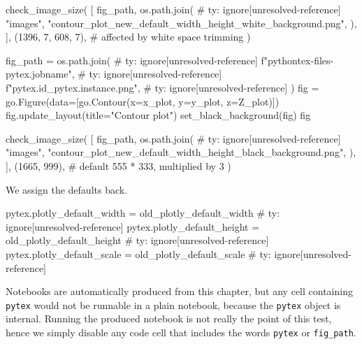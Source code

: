 \documentclass[oneside]{book}
\begin{document}
\begin{pycell}
check_image_size(
    [
        fig_path,
        os.path.join(  # ty: ignore[unresolved-reference]
            "images",
            "contour_plot_new_default_width_height_white_background.png",
        ),
    ],
    (1396, 7, 608, 7),  # affected by white space trimming
)
\end{pycell}

\begin{pycell}
fig_path = os.path.join(  # ty: ignore[unresolved-reference]
    f"pythontex-files-{pytex.jobname}",  # ty: ignore[unresolved-reference]
    f"{pytex.id}_{pytex.instance}.png",  # ty: ignore[unresolved-reference]
)
fig = go.Figure(data=[go.Contour(x=x_plot, y=y_plot, z=Z_plot)])
fig.update_layout(title="Contour plot")
set_black_background(fig)
fig
\end{pycell}

\begin{pycell}
check_image_size(
    [
        fig_path,
        os.path.join(  # ty: ignore[unresolved-reference]
            "images",
            "contour_plot_new_default_width_height_black_background.png",
        ),
    ],
    (1665, 999),  # default 555 * 333, multiplied by 3
)
\end{pycell}

\begin{mdcell}
We assign the defaults back.
\end{mdcell}

\begin{pycell}
pytex.plotly_default_width = old_plotly_default_width  # ty: ignore[unresolved-reference]
pytex.plotly_default_height = old_plotly_default_height  # ty: ignore[unresolved-reference]
pytex.plotly_default_scale = old_plotly_default_scale  # ty: ignore[unresolved-reference]
\end{pycell}

Notebooks are automatically produced from this chapter, but any cell containing \texttt{pytex} would not be runnable in a plain notebook, because the \texttt{pytex} object is internal. Running the produced notebook is not really the point of this test, hence we simply disable any code cell that includes the words \texttt{pytex} or \texttt{fig\_path}.
\end{document}
